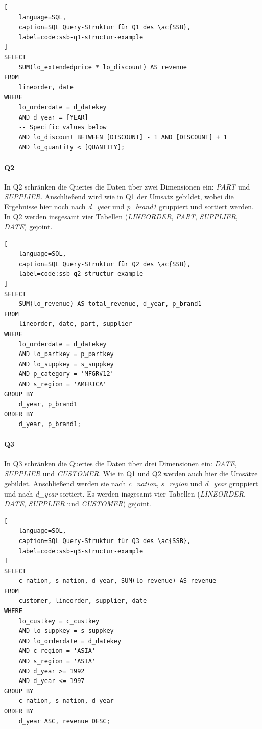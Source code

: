 \begin{lstlisting}[
    language=SQL,
    caption=SQL Query-Struktur für Q1 des \ac{SSB},
    label=code:ssb-q1-structur-example
]
SELECT 
    SUM(lo_extendedprice * lo_discount) AS revenue
FROM 
    lineorder, date
WHERE 
    lo_orderdate = d_datekey
    AND d_year = [YEAR]
    -- Specific values below
    AND lo_discount BETWEEN [DISCOUNT] - 1 AND [DISCOUNT] + 1
    AND lo_quantity < [QUANTITY];
\end{lstlisting}

\paragraph{Q2}
In Q2 schränken die Queries die Daten über zwei Dimensionen ein: \emph{PART} und \emph{SUPPLIER}.
Anschließend wird wie in Q1 der Umsatz gebildet, wobei die Ergebnisse hier noch nach \emph{d\_year} und \emph{p\_brand1} gruppiert und sortiert werden.  
In Q2 werden insgesamt vier Tabellen (\emph{LINEORDER}, \emph{PART}, \emph{SUPPLIER}, \emph{DATE}) gejoint.
\begin{lstlisting}[
    language=SQL,
    caption=SQL Query-Struktur für Q2 des \ac{SSB},
    label=code:ssb-q2-structur-example
]
SELECT 
    SUM(lo_revenue) AS total_revenue, d_year, p_brand1
FROM 
    lineorder, date, part, supplier
WHERE 
    lo_orderdate = d_datekey
    AND lo_partkey = p_partkey
    AND lo_suppkey = s_suppkey
    AND p_category = 'MFGR#12'
    AND s_region = 'AMERICA'
GROUP BY 
    d_year, p_brand1
ORDER BY 
    d_year, p_brand1;

\end{lstlisting}

\paragraph{Q3}
In Q3 schränken die Queries die Daten über drei Dimensionen ein: \emph{DATE}, \emph{SUPPLIER} und \emph{CUSTOMER}.
Wie in Q1 und Q2 werden auch hier die Umsätze gebildet.
Anschließend werden sie nach \emph{c\_nation}, \emph{s\_region} und \emph{d\_year} gruppiert und nach \emph{d\_year} sortiert.
Es werden insgesamt vier Tabellen (\emph{LINEORDER}, \emph{DATE}, \emph{SUPPLIER} und \emph{CUSTOMER}) gejoint.
\begin{lstlisting}[
    language=SQL,
    caption=SQL Query-Struktur für Q3 des \ac{SSB},
    label=code:ssb-q3-structur-example
]
SELECT 
    c_nation, s_nation, d_year, SUM(lo_revenue) AS revenue
FROM 
    customer, lineorder, supplier, date
WHERE 
    lo_custkey = c_custkey
    AND lo_suppkey = s_suppkey
    AND lo_orderdate = d_datekey
    AND c_region = 'ASIA'
    AND s_region = 'ASIA'
    AND d_year >= 1992
    AND d_year <= 1997
GROUP BY 
    c_nation, s_nation, d_year
ORDER BY 
    d_year ASC, revenue DESC;
\end{lstlisting}

